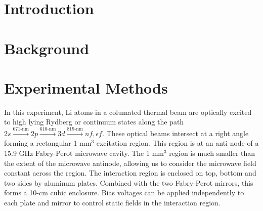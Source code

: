 \documentclass[aps,pra,preprint,groupedaddress]{revtex4-1}
\begin{document}
\maketitle

\section{\label{intro}Introduction}

\section{Background}
\label{sec:back}

\section{Experimental Methods}
\label{sec:exp}

In this experiment, Li atoms in a columated thermal beam are optically excited to high lying Rydberg or continuum states along the path $2s \xrightarrow{\text{671-nm}} 2p \xrightarrow{\text{610-nm}} 3d \xrightarrow{\text{819-nm}} nf, \epsilon f$. These optical beams intersect at a right angle forming a rectangular 1 mm$^3$ excitation region. This region is at an anti-node of a 15.9 GHz Fabry-Perot microwave cavity. The 1 mm$^3$ region is much smaller than the extent of the microwave antinode, allowing us to consider the microwave field constant across the region. The interaction region is enclosed on top, bottom and two sides by aluminum plates. Combined with the two Fabry-Perot mirrors, this forms a 10-cm cubic enclosure. Bias voltages can be applied independently to each plate and mirror to control static fields in the interaction region.
\end{document}
